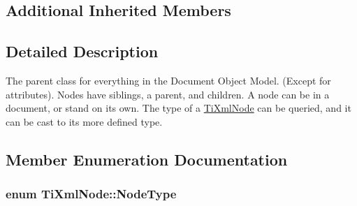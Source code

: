 \subsection*{Additional Inherited Members}


\subsection{Detailed Description}
The parent class for everything in the Document Object Model. (Except for attributes). Nodes have siblings, a parent, and children. A node can be in a document, or stand on its own. The type of a \hyperlink{class_ti_xml_node}{Ti\-Xml\-Node} can be queried, and it can be cast to its more defined type. 

\subsection{Member Enumeration Documentation}
\hypertarget{class_ti_xml_node_a836eded4920ab9e9ef28496f48cd95a2}{
\subsubsection[{Node\-Type}]{\setlength{\rightskip}{0pt plus 5cm}enum {\bf Ti\-Xml\-Node\-::\-Node\-Type}}}\label{class_ti_xml_node_a836eded4920ab9e9ef28496f48cd95a2}
